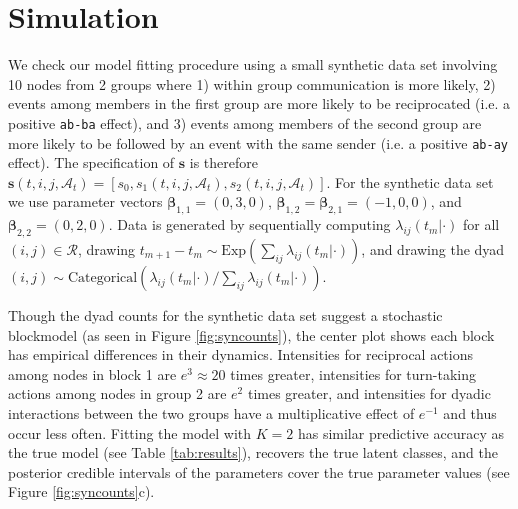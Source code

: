 \section{Simulation}

We check our model fitting procedure using a small synthetic data set involving 10 nodes from 2 groups where 1) within group communication is more likely, 2) events among members in the first group are more likely to be reciprocated  (i.e. a positive \texttt{ab-ba} effect), and 3) events among members of the second group are more likely to be followed by an event with the same sender (i.e. a positive \texttt{ab-ay} effect).  The specification of $\textbf{s}$ is therefore $\textbf{s}(t,i,j,\mathcal{A}_t) = [s_0, s_{1}(t,i,j,\mathcal{A}_t), s_{2}(t,i,j,\mathcal{A}_t)]$.  For the synthetic data set we use parameter vectors $\boldsymbol{\beta}_{1,1} = (0,3,0)$,  $\boldsymbol{\beta}_{1,2} = \boldsymbol{\beta}_{2,1} = (-1,0,0)$, and $\boldsymbol{\beta}_{2,2} = (0,2,0)$.
Data is generated by sequentially computing $\lambda_{ij}(t_m|\cdot)$ for all $(i,j) \in \mathcal{R}$, drawing $t_{m+1}-t_m \sim \mbox{Exp}(\sum_{ij} \lambda_{ij}(t_m|\cdot))$, and drawing the dyad $(i,j) \sim \mbox{Categorical}(\lambda_{ij}(t_m|\cdot) / \sum_{ij}\lambda_{ij}(t_m|\cdot))$.

Though the dyad counts for the synthetic data set suggest a stochastic blockmodel (as seen in Figure  \ref{fig:syncounts}),  the center plot shows each block has empirical differences in their dynamics.
Intensities for reciprocal actions among nodes in block 1 are $e^3 \approx 20$ times greater, intensities for turn-taking actions among nodes in group 2 are $e^2$ times greater, and intensities for dyadic interactions between the two groups have a multiplicative effect of $e^{-1}$ and thus occur less often.
Fitting the model with $K=2$ has similar  predictive accuracy as the true model (see Table \ref{tab:results}), recovers the true latent classes, and the posterior credible intervals of the parameters cover the true parameter values (see Figure \ref{fig:syncounts}c).
